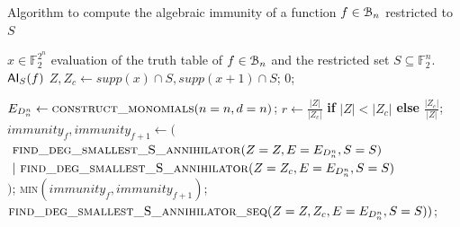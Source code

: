 \documentclass[11pt]{llncs}
\begin{document}
\begin{algorithm}
\small
    \caption{Algorithm to compute the algebraic immunity of a function $f\in \mathcal{B}_{n}$ restricted to $S$}\label{alg:fullAlg3ForAIRestrictesSetOpt}
    \begin{algorithmic}[1]
        \Require $x\in \mathbb{F}_2^{2^n}$ evaluation of the truth table of $f\in \mathcal{B}_{n}$ and the restricted set $S\subseteq \mathbb{F}_2^n$.
		\Ensure $\mathsf{AI}_S(f)$
        \State
        \State $Z, Z_c \gets supp(x)\cap S, supp(x+1) \cap S$;
            \State \Return $0$;
        \EndIf
        \State

        \State $E_{D_n^n} \leftarrow \mbox{\textsc{construct\_monomials}}(n=n, d=n)$\footnotemark;
        \State $r\gets \frac{|Z|}{|Z_c|}$ \textbf{if} $|Z| < |Z_c|$ \textbf{else} $\frac{|Z_c|}{|Z|}$;
            \State $immunity_f, immunity_{f+1} \leftarrow ($\\
		$\ \mbox{\textsc{find\_deg\_smallest\_S\_annihilator}}(Z=Z, E=E_{D_n^n}, S=S)$\\
		$\ |\ \mbox{\textsc{find\_deg\_smallest\_S\_annihilator}}(Z=Z_c, E=E_{D_n^n}, S=S)$\\
		$)$;
            \State \Return \textsc{min}$\left(immunity_f, immunity_{f+1}\right)$;
        \Else
            \State \Return $\mbox{\textsc{find\_deg\_smallest\_S\_annihilator\_seq}}(Z=Z, Z_c, E=E_{D_n^n}, S=S))$\footnotemark;
        \EndIf
    \end{algorithmic}
\end{algorithm}


\setcounter{algorithm}{0} 
\end{document}
